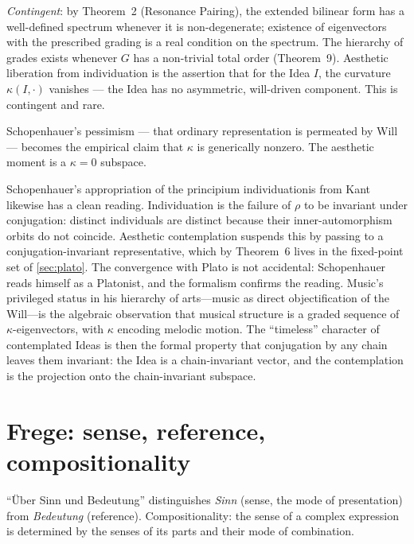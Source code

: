\formalstatus \emph{Contingent}: by Theorem~2 (Resonance Pairing), the
extended bilinear form has a well-defined spectrum whenever it is
non-degenerate; existence of eigenvectors with the prescribed grading is
a real condition on the spectrum. The hierarchy of grades exists
whenever $G$ has a non-trivial total order (Theorem~9). Aesthetic
liberation from individuation is the assertion that for the Idea $I$,
the curvature $\kappa(I, \cdot)$ vanishes --- the Idea has no
asymmetric, will-driven component. This is contingent and rare.

\litcomment Schopenhauer's pessimism --- that ordinary representation is
permeated by Will --- becomes the empirical claim that $\kappa$ is
generically nonzero. The aesthetic moment is a $\kappa=0$ subspace.

Schopenhauer's appropriation of the principium individuationis from
Kant likewise has a clean reading. Individuation is the failure of
$\rho$ to be invariant under conjugation: distinct individuals are
distinct because their inner-automorphism orbits do not coincide.
Aesthetic contemplation suspends this by passing to a
conjugation-invariant representative, which by Theorem~6 lives in the
fixed-point set of \cref{sec:plato}. The convergence with Plato is not
accidental: Schopenhauer reads himself as a Platonist, and the
formalism confirms the reading. Music's privileged status in his
hierarchy of arts---music as direct objectification of the Will---is
the algebraic observation that musical structure is a graded sequence
of $\kappa$-eigenvectors, with $\kappa$ encoding melodic motion. The
``timeless'' character of contemplated Ideas is then the formal
property that conjugation by any chain leaves them invariant: the
Idea is a chain-invariant vector, and the contemplation is the
projection onto the chain-invariant subspace.

\section{Frege: sense, reference, compositionality}\label{sec:frege}

 ``\"Uber Sinn und Bedeutung''
\cite{Frege1892} distinguishes \emph{Sinn} (sense, the mode of
presentation) from \emph{Bedeutung} (reference). Compositionality: the
sense of a complex expression is determined by the senses of its
parts and their mode of combination.


